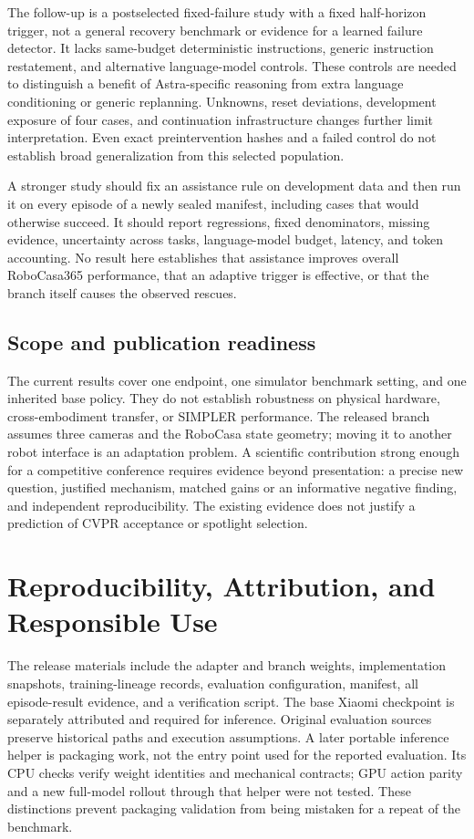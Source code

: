 \documentclass[10pt,twocolumn,letterpaper]{article}
\begin{document}
The follow-up is a postselected fixed-failure study with a fixed half-horizon trigger, not a general recovery benchmark or evidence for a learned failure detector. It lacks same-budget deterministic instructions, generic instruction restatement, and alternative language-model controls. These controls are needed to distinguish a benefit of Astra-specific reasoning from extra language conditioning or generic replanning. Unknowns, reset deviations, development exposure of four cases, and continuation infrastructure changes further limit interpretation. Even exact preintervention hashes and a failed control do not establish broad generalization from this selected population.


A stronger study should fix an assistance rule on development data and then run it on every episode of a newly sealed manifest, including cases that would otherwise succeed. It should report regressions, fixed denominators, missing evidence, uncertainty across tasks, language-model budget, latency, and token accounting. No result here establishes that assistance improves overall RoboCasa365 performance, that an adaptive trigger is effective, or that the branch itself causes the observed rescues.


\subsection{Scope and publication readiness}

The current results cover one endpoint, one simulator benchmark setting, and one inherited base policy. They do not establish robustness on physical hardware, cross-embodiment transfer, or SIMPLER performance. The released branch assumes three cameras and the RoboCasa state geometry; moving it to another robot interface is an adaptation problem. A scientific contribution strong enough for a competitive conference requires evidence beyond presentation: a precise new question, justified mechanism, matched gains or an informative negative finding, and independent reproducibility. The existing evidence does not justify a prediction of CVPR acceptance or spotlight selection.


\section{Reproducibility, Attribution, and Responsible Use}

The release materials include the adapter and branch weights, implementation snapshots, training-lineage records, evaluation configuration, manifest, all episode-result evidence, and a verification script. The base Xiaomi checkpoint is separately attributed and required for inference. Original evaluation sources preserve historical paths and execution assumptions. A later portable inference helper is packaging work, not the entry point used for the reported evaluation. Its CPU checks verify weight identities and mechanical contracts; GPU action parity and a new full-model rollout through that helper were not tested. These distinctions prevent packaging validation from being mistaken for a repeat of the benchmark.
\end{document}
